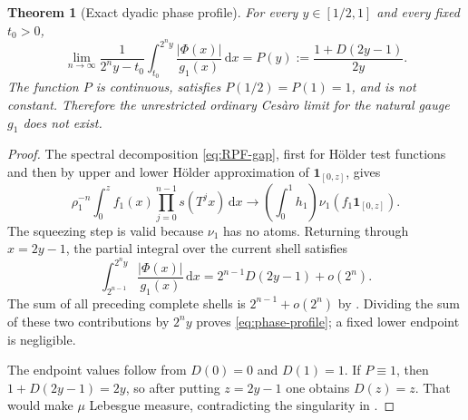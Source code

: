 \documentclass[11pt,oneside]{article}
\numberwithin{equation}{section}
\newtheorem{theorem}{Theorem}[section]
\theoremstyle{definition}
\theoremstyle{remark}
\newcommand{\dd}{\,\mathrm d}
\newcommand{\abs}[1]{\left|#1\right|}
\newcommand{\ind}{\mathbf 1}
\newcommand{\PhiUp}{\Phi}
\newcommand{\defeq}{\mathrel{:=}}
\begin{document}
\begin{theorem}[Exact dyadic phase profile]
\label{thm:phase-profile}
For every \(y\in[1/2,1]\) and every fixed \(t_0>0\),
\begin{equation}
 \lim_{n\to\infty}
 \frac1{2^ny-t_0}\int_{t_0}^{2^ny}
 \frac{\abs{\PhiUp(x)}}{g_1(x)}\dd x
 =P(y)\defeq\frac{1+D(2y-1)}{2y}.
 \label{eq:phase-profile}
\end{equation}
The function \(P\) is continuous, satisfies \(P(1/2)=P(1)=1\), and is not constant.
Therefore the unrestricted ordinary Ces\`aro limit for the natural gauge \(g_1\) does not
exist.
\end{theorem}

\begin{proof}
The spectral decomposition \eqref{eq:RPF-gap}, first for H\"older test functions and then
by upper and lower H\"older approximation of \(\ind_{[0,z]}\), gives
\begin{equation}
 \rho_1^{-n}\int_0^z f_1(x)
 \prod_{j=0}^{n-1}s(T^jx)\dd x
 \longrightarrow
 \left(\int_0^1h_1\right)\nu_1(f_1\ind_{[0,z]}).
 \label{eq:partial-RPF}
\end{equation}
The squeezing step is valid because \(\nu_1\) has no atoms.  Returning through
\(x=2y-1\), the partial integral over the current shell satisfies
\begin{equation}
 \int_{2^{n-1}}^{2^ny}\frac{\abs{\PhiUp(x)}}{g_1(x)}\dd x
 =2^{n-1}D(2y-1)+o(2^n).
 \label{eq:partial-shell}
\end{equation}
The sum of all preceding complete shells is
\(2^{n-1}+o(2^n)\) by .  Dividing the sum of these two contributions
by \(2^ny\) proves \eqref{eq:phase-profile}; a fixed lower endpoint is negligible.

The endpoint values follow from \(D(0)=0\) and \(D(1)=1\).  If \(P\equiv1\), then
\(1+D(2y-1)=2y\), so after putting \(z=2y-1\) one obtains \(D(z)=z\).  That would make
\(\mu\) Lebesgue measure, contradicting the singularity in
.
\end{proof}

\begin{center}
\end{center}
\end{document}
